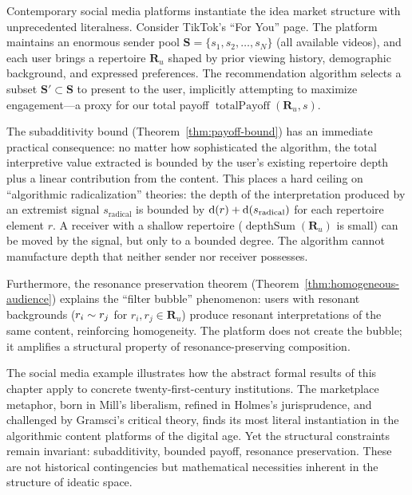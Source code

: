 \begin{example}
Contemporary social media platforms instantiate the idea market structure
with unprecedented literalness.  Consider TikTok's ``For You'' page.  The
platform maintains an enormous sender pool
$\mathbf{S} = \{s_1, s_2, \dots, s_N\}$ (all available videos), and each
user brings a repertoire $\mathbf{R}_u$ shaped by prior viewing history,
demographic background, and expressed preferences.  The recommendation
algorithm selects a subset $\mathbf{S}' \subset \mathbf{S}$ to present to
the user, implicitly attempting to maximize engagement---a proxy for our
total payoff $\operatorname{totalPayoff}(\mathbf{R}_u, s)$.

The subadditivity bound (Theorem~\ref{thm:payoff-bound}) has an immediate
practical consequence: no matter how sophisticated the algorithm, the total
interpretive value extracted is bounded by the user's existing repertoire
depth plus a linear contribution from the content.  This places a hard
ceiling on ``algorithmic radicalization'' theories: the depth of the
interpretation produced by an extremist signal $s_{\text{radical}}$ is
bounded by $\operatorname{d}(r) + \operatorname{d}(s_{\text{radical}})$ for each repertoire
element $r$.  A receiver with a shallow repertoire
($\operatorname{depthSum}(\mathbf{R}_u)$ is small) can be moved by the
signal, but only to a bounded degree.  The algorithm cannot manufacture
depth that neither sender nor receiver possesses.

Furthermore, the resonance preservation theorem
(Theorem~\ref{thm:homogeneous-audience}) explains the ``filter bubble''
phenomenon: users with resonant backgrounds
($r_i \sim r_j$ for $r_i, r_j \in \mathbf{R}_u$) produce resonant
interpretations of the same content, reinforcing homogeneity.  The platform
does not create the bubble; it amplifies a structural property of
resonance-preserving composition.
\end{example}

The social media example illustrates how the abstract formal results of this
chapter apply to concrete twenty-first-century institutions.  The marketplace
metaphor, born in Mill's liberalism, refined in Holmes's jurisprudence, and
challenged by Gramsci's critical theory, finds its most literal instantiation
in the algorithmic content platforms of the digital age.  Yet the structural
constraints remain invariant: subadditivity, bounded payoff, resonance
preservation.  These are not historical contingencies but mathematical
necessities inherent in the structure of ideatic space.

